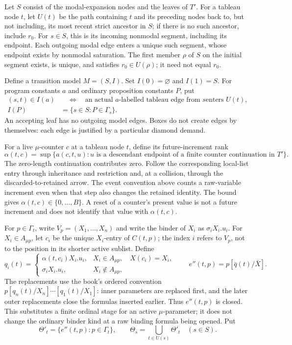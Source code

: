 Let \(S\) consist of the modal-expansion nodes and
the leaves of \(T'\). For a tableau node \(t\), let
\(U(t)\) be the path containing \(t\) and its
preceding nodes back to, but not including, its most
recent strict ancestor in \(S\); if there is no such
ancestor, include \(r_0\). For \(s\in S\), this is
its incoming nonmodal segment, including its endpoint.
Each outgoing modal edge enters a unique such segment,
whose endpoint exists by nonmodal saturation. The
first member \(\rho\) of \(S\) on the initial
segment exists, is unique, and satisfies
\(r_0\in U(\rho)\); it need not equal \(r_0\).

Define a transition model \(M=(S,I)\).
Set \(I(0)=\varnothing\) and \(I(1)=S\).
For program constants \(a\) and ordinary
proposition constants \(P\), put
\[
\begin{aligned}
 (s,t)\in I(a)
   &\quad\Longleftrightarrow\quad
   \text{an actual \(a\)-labelled tableau edge from \(s\)
          enters \(U(t)\)},\\
 I(P)&=\{s\in S:P\in\Gamma_s\}.
\end{aligned}
\]
An accepting leaf has no outgoing model edges.
Boxes do not create edges by themselves: each edge
is justified by a particular diamond demand.

For a live \(\mu\)-counter \(c\) at a tableau
node \(t\), define its future-increment rank
\[
 \alpha(t,c)=\sup\{a(c,t,u):
       u\text{ is a descendant endpoint of a finite
       counter continuation in }T'\}.
\]
The zero-length continuation contributes zero. Follow
the corresponding local-list entry through inheritance
and restriction and, at a collision, through the
discarded-to-retained arrow. The event convention above
counts a raw-variable increment even when that step
also changes the retained identity. The bound gives
\(\alpha(t,c)\in\{0,\ldots,B\}\). A reset of a
counter's present value is not a future increment and
does not identify that value with \(\alpha(t,c)\).

For \(p\in\Gamma_t\), write
\(V_p=(X_1,\ldots,X_n)\) and write the binder
of \(X_i\) as \(\sigma_iX_i.u_i\).
For \(X_i\in A_{\mu p}\), let \(c_i\) be
the unique \(X_i\)-entry of \(C(t,p)\);
the index \(i\) refers to \(V_p\), not to
the position in its shorter active sublist.
Define
\[
 q_i(t)=
 \begin{cases}
   \alpha(t,c_i)X_i.u_i,
       &X_i\in A_{\mu p},\quad X(c_i)=X_i,\\
   \sigma_iX_i.u_i,&X_i\notin A_{\mu p},
 \end{cases}
 \qquad
 e''(t,p)=p[\bar q(t)/\bar X].
\]
The replacements use the book's ordered convention
\(p[q_n(t)/X_n]\cdots[q_1(t)/X_1]\): inner
parameters are replaced first, and the later outer
replacements close the formulas inserted earlier.
Thus \(e''(t,p)\) is closed. This substitutes a
finite ordinal stage for an active \(\mu\)-parameter;
it does not change the ordinary binder kind at a raw
binding formula being opened. Put
\[
 \Theta'_t=\{e''(t,p):p\in\Gamma_t\},
 \qquad
 \Theta_s=\bigcup_{t\in U(s)}\Theta'_t
       \quad(s\in S).
\]

